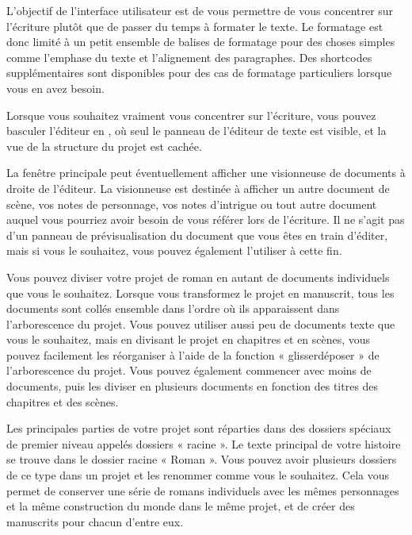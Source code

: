 \documentclass[a4paper,11pt,french]{sphinxmanual}
\begin{document}
\begin{description}
\sphinxAtStartPar
L’objectif de l’interface utilisateur est de vous permettre de vous concentrer sur l’écriture plutôt que de passer du temps à formater le texte. Le formatage est donc limité à un petit ensemble de balises de formatage pour des choses simples comme l’emphase du texte et l’alignement des paragraphes. Des shortcodes supplémentaires sont disponibles pour des cas de formatage particuliers lorsque vous en avez besoin.

\sphinxAtStartPar
Lorsque vous souhaitez vraiment vous concentrer sur l’écriture, vous pouvez basculer l’éditeur en , où seul le panneau de l’éditeur de texte est visible, et la vue de la structure du projet est cachée.

\sphinxAtStartPar
La fenêtre principale peut éventuellement afficher une visionneuse de documents à droite de l’éditeur. La visionneuse est destinée à afficher un autre document de scène, vos notes de personnage, vos notes d’intrigue ou tout autre document auquel vous pourriez avoir besoin de vous référer lors de l’écriture. Il ne s’agit pas d’un panneau de prévisualisation du document que vous êtes en train d’éditer, mais si vous le souhaitez, vous pouvez également l’utiliser à cette fin.

\sphinxAtStartPar
Vous pouvez diviser votre projet de roman en autant de documents individuels que vous le souhaitez. Lorsque vous transformez le projet en manuscrit, tous les documents sont collés ensemble dans l’ordre où ils apparaissent dans l’arborescence du projet. Vous pouvez utiliser aussi peu de documents texte que vous le souhaitez, mais en divisant le projet en chapitres et en scènes, vous pouvez facilement les réorganiser à l’aide de la fonction « glisser\sphinxhyphen{}déposer » de l’arborescence du projet. Vous pouvez également commencer avec moins de documents, puis les diviser en plusieurs documents en fonction des titres des chapitres et des scènes.

\sphinxAtStartPar
Les principales parties de votre projet sont réparties dans des dossiers spéciaux de premier niveau appelés dossiers « racine ». Le texte principal de votre histoire se trouve dans le dossier racine « Roman ». Vous pouvez avoir plusieurs dossiers de ce type dans un projet et les renommer comme vous le souhaitez. Cela vous permet de conserver une série de romans individuels avec les mêmes personnages et la même construction du monde dans le même projet, et de créer des manuscrits pour chacun d’entre eux.


\end{description}
\end{document}
